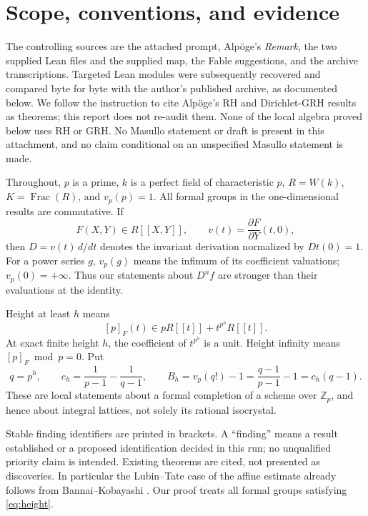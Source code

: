 \documentclass[11pt,a4paper]{article}
\theoremstyle{definition}\newtheorem{remark}[theorem]{Remark}
\newcommand{\Z}{\mathbb Z}\newcommand{\Q}{\mathbb Q}\newcommand{\F}{\mathbb F}
\newcommand{\vp}{v_p}\newcommand{\dR}{\mathrm{dR}}\newcommand{\crys}{\mathrm{crys}}
\begin{document}
\section{Scope, conventions, and evidence}

The controlling sources are the attached prompt, Alp\"oge's \emph{Remark}, the two supplied Lean files and the supplied map, the Fable suggestions, and the archive transcriptions. Targeted Lean modules were subsequently recovered and compared byte for byte with the author's published archive, as documented below. We follow the instruction to cite Alp\"oge's RH and Dirichlet-GRH results as theorems; this report does not re-audit them. None of the local algebra proved below uses RH or GRH. No Masullo statement or draft is present in this attachment, and no claim conditional on an unspecified Masullo statement is made.

Throughout, $p$ is a prime, $k$ is a perfect field of characteristic $p$, $R=W(k)$, $K=\operatorname{Frac}(R)$, and $\vp(p)=1$. All formal groups in the one-dimensional results are commutative. If
\[
 F(X,Y)\in R[[X,Y]],\qquad v(t)=\frac{\partial F}{\partial Y}(t,0),
\]
then $D=v(t)\,d/dt$ denotes the invariant derivation normalized by $Dt(0)=1$. For a power series $g$, $\vp(g)$ means the infimum of its coefficient valuations; $\vp(0)=+\infty$. Thus our statements about $D^n f$ are stronger than their evaluations at the identity.

Height at least $h$ means
\begin{equation}\label{eq:height}
 [p]_F(t)\in pR[[t]]+t^{p^h}R[[t]].
\end{equation}
At exact finite height $h$, the coefficient of $t^{p^h}$ is a unit. Height infinity means $[p]_F\bmod p=0$. Put
\begin{equation}\label{eq:constants}
 q=p^h,\qquad c_h=\frac1{p-1}-\frac1{q-1},\qquad
 B_h=\vp(q!)-1=\frac{q-1}{p-1}-1=c_h(q-1).
\end{equation}
These are local statements about a formal completion of a scheme over $\Z_p$, and hence about integral lattices, not solely its rational isocrystal.

Stable finding identifiers are printed in brackets. A ``finding'' means a result established or a proposed identification decided in this run; no unqualified priority claim is intended. Existing theorems are cited, not presented as discoveries. In particular the Lubin--Tate case of the affine estimate already follows from Bannai--Kobayashi \cite[\S2, p.~527; Propositions 3.3 and 3.5, pp.~529, 531]{BK}. Our proof treats all formal groups satisfying \eqref{eq:height}.
\end{document}
